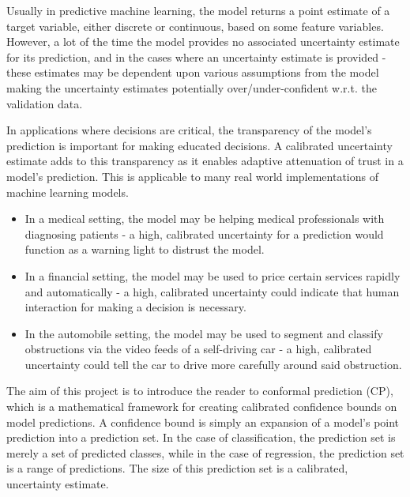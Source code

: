 

Usually in predictive machine learning, the model returns a point estimate of a target variable, either discrete or continuous, based on some feature variables. However, a lot of the time the model provides no associated uncertainty estimate for its prediction, and in the cases where an uncertainty estimate is provided - these estimates may be dependent upon various assumptions from the model making the uncertainty estimates potentially over/under-confident w.r.t. the validation data. 

In applications where decisions are critical, the transparency of the model's prediction is important for making educated decisions. A calibrated uncertainty estimate adds to this transparency as it enables adaptive attenuation of trust in a model's prediction. This is applicable to many real world implementations of machine learning models. 
\begin{itemize}
    \item In a medical setting, the model may be helping medical professionals with diagnosing patients - a high, calibrated uncertainty for a prediction would function as a warning light to distrust the model.
    \item In a financial setting, the model may be used to price certain services rapidly and automatically - a high, calibrated uncertainty could indicate that human interaction for making a decision is necessary.
    \item In the automobile setting, the model may be used to segment and classify obstructions via the video feeds of a self-driving car - a high, calibrated uncertainty could tell the car to drive more carefully around said obstruction.
\end{itemize}

The aim of this project is to introduce the reader to conformal prediction (CP), which is a mathematical framework for creating calibrated confidence bounds on model predictions. A confidence bound is simply an expansion of a model's point prediction into a prediction set. In the case of classification, the prediction set is merely a set of predicted classes, while in the case of regression, the prediction set is a range of predictions. The size of this prediction set is a calibrated, uncertainty estimate.

